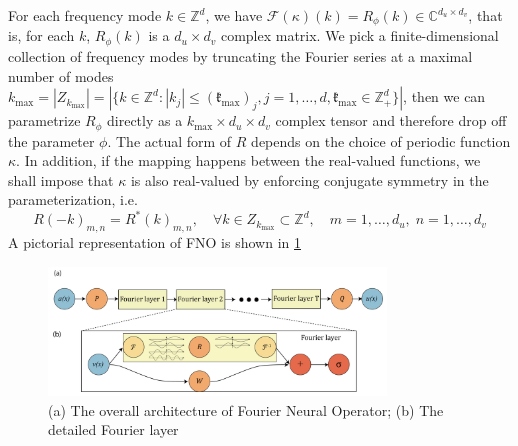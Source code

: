 \documentclass{article}
\begin{document}
For each frequency mode $k\in\mathbb{Z}^d$, we have $\mathcal{F}(\kappa)(k) = R_\phi(k)\in\mathbb{C}^{d_u\times d_v}$, that is, for each $k$, $R_\phi(k)$ is a $d_u\times d_v$ complex matrix. We pick a finite-dimensional collection of frequency modes by truncating the Fourier series at a maximal number of modes $k_{\max} = \left\lvert Z_{k_{\max}}\right\rvert = \left\lvert \{k\in\mathbb{Z}^d: \left\lvert k_j \right\rvert \leq (\mathfrak{k}_{\max})_j, j=1,\dots,d, \mathfrak{k}_{\max}\in\mathbb{Z}_{+}^d\}\right\rvert $, then we can parametrize $R_\phi$ directly as a $k_{\max}\times d_u\times d_v$ complex tensor and therefore drop off the parameter $\phi$. The actual form of $R$ depends on the choice of periodic function $\kappa$. In addition, if the mapping happens between the real-valued functions, we shall impose that $\kappa$ is also real-valued by enforcing conjugate symmetry in the parameterization, i.e.
\begin{equation}
    R(-k)_{m,n} = R^*(k)_{m, n}, \quad \forall k\in Z_{k_{\max}}\subset\mathbb{Z}^d,\quad m=1,\dots,d_u, \;n=1,\dots,d_v
\end{equation}
A pictorial representation of FNO is shown in \ref{fig: FNO}
\begin{figure} \label{fig: FNO}
    \centering
    \includegraphics[width=0.8\textwidth]{figures/FNO.png}
    \caption{(a) The overall architecture of Fourier Neural Operator; (b) The detailed Fourier layer}
\end{figure}
\end{document}
